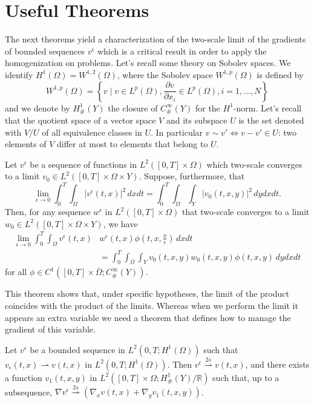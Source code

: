 \section{Useful Theorems}
The next theorems yield a characterization of the two-scale limit of the gradients of bounded sequences $v^{\epsilon}$ which is a critical result in order to apply the homogenization on problems. Let's recall some theory on Sobolev spaces.
We identify $H^{1}(\Omega)=W^{1,2}(\Omega)$, where the Sobolev space $W^{1, p}(\Omega)$ is defined by
$$
W^{1, p}(\Omega)=\left\{v \mid v \in L^{p}(\Omega), \frac{\partial v}{\partial x_{i}} \in L^{p}(\Omega), i=1, \ldots, N\right\}
$$
and we denote by $H_{\#}^{1}(Y)$ the closure of $C_{\#}^{\infty}(Y)$ for the $H^{1}$-norm.
Let's recall that the quotient space of a vector space $V$ and its subspace $U$ is the set denoted with $V/U$ of all equivalence classes in $U$. In particular $v \sim v' \iff v-v'\in U$: two elements of $V$ differ at most to elements that belong to $U$.
\begin{theorem}
Let $v^{\epsilon}$ be a sequence of functions in $L^{2}([0, T] \times \Omega)$ which two-scale converges to a limit $v_{0} \in L^{2}([0, T] \times \Omega \times Y)$. Suppose, furthermore, that
$$
\lim _{\epsilon \rightarrow 0} \int_{0}^{T} \int_{\Omega}\left|v^{\epsilon}(t, x)\right|^{2} \, dxdt=\int_{0}^{T} \int_{\Omega} \int_{Y}\left|v_{0}(t, x, y)\right|^{2} \, dy dx dt.
$$
Then, for any sequence $w^{\epsilon}$ in $L^{2}([0, T] \times \Omega)$ that two-scale converges to a limit $w_{0} \in L^{2}([0, T] \times \Omega \times Y)$, we have
$$
\begin{aligned}
\lim _{\epsilon \rightarrow 0} \int_{0}^{T} \int_{\Omega} v^{\epsilon}(t, x) & w^{\epsilon}(t, x) \phi\left(t, x, \frac{x}{\epsilon}\right) \, dxdt \\
&=\int_{0}^{T} \int_{\Omega} \int_{Y} v_{0}(t, x, y) w_{0}(t, x, y) \phi(t, x, y) \, dy dx dt
\end{aligned}
$$for all $\phi \in C^{1}\left([0, T] \times \bar{\Omega} ; C_{\#}^{\infty}(Y)\right)$.
\label{thm 7.2}\end{theorem}
This theorem shows that, under specific hypotheses, the limit of the product coincides with the product of the limits. Whereas when we perform the limit it appears an extra variable we need a theorem that defines how to manage the gradient of this variable.
\begin{theorem}
Let $v^{\epsilon}$ be a bounded sequence in $L^{2}\left(0, T ; H^{1}(\Omega)\right)$ such that $v_{\epsilon}(t,x)\rightharpoonup v(t,x)$  in $L^{2}\left(0, T ; H^{1}(\Omega)\right)$. Then $v^{\epsilon} \overset{2s}{\rightharpoonup} v(t, x)$, and there exists a function $v_{1}(t, x, y)$ in $L^{2}\left([0, T] \times \Omega ; H_{\#}^{1}(Y) / \mathbb{R}\right)$ such that, up to a subsequence, $\nabla v^{\epsilon}  \overset{2s}{\rightharpoonup} \left(\nabla_{x} v(t, x)+\nabla_{y} v_{1}(t, x, y)\right)$. 
\label{thm 7.3}\end{theorem}
